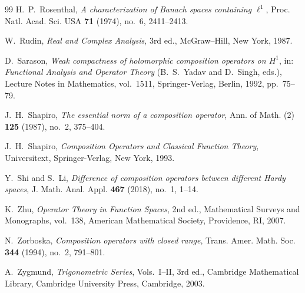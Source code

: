 \documentclass[11pt, reqno]{amsart}
\theoremstyle{definition}
\theoremstyle{remark}
\begin{document}
\begin{thebibliography}{99}
H.~P.~Rosenthal,
\textit{A characterization of Banach spaces containing \(\ell^1\)},
Proc. Natl. Acad. Sci. USA \textbf{71} (1974), no.~6, 2411--2413.

W.~Rudin,
\textit{Real and Complex Analysis},
3rd ed., McGraw--Hill, New York, 1987.

D.~Sarason,
\textit{Weak compactness of holomorphic composition operators on \(H^1\)},
in: \textit{Functional Analysis and Operator Theory}
(B.~S.~Yadav and D.~Singh, eds.),
Lecture Notes in Mathematics, vol.~1511,
Springer-Verlag, Berlin, 1992, pp.~75--79.

J.~H.~Shapiro,
\textit{The essential norm of a composition operator},
Ann. of Math. (2) \textbf{125} (1987), no.~2, 375--404.

J.~H.~Shapiro,
\textit{Composition Operators and Classical Function Theory},
Universitext, Springer-Verlag, New York, 1993.

Y.~Shi and S.~Li,
\textit{Difference of composition operators between different Hardy
spaces},
J. Math. Anal. Appl. \textbf{467} (2018), no.~1, 1--14.

K.~Zhu,
\textit{Operator Theory in Function Spaces},
2nd ed., Mathematical Surveys and Monographs, vol.~138,
American Mathematical Society, Providence, RI, 2007.

N.~Zorboska,
\textit{Composition operators with closed range},
Trans. Amer. Math. Soc. \textbf{344} (1994), no.~2, 791--801.

A.~Zygmund,
\textit{Trigonometric Series},
Vols.~I--II, 3rd ed., Cambridge Mathematical Library,
Cambridge University Press, Cambridge, 2003.

\end{thebibliography}
\end{document}
